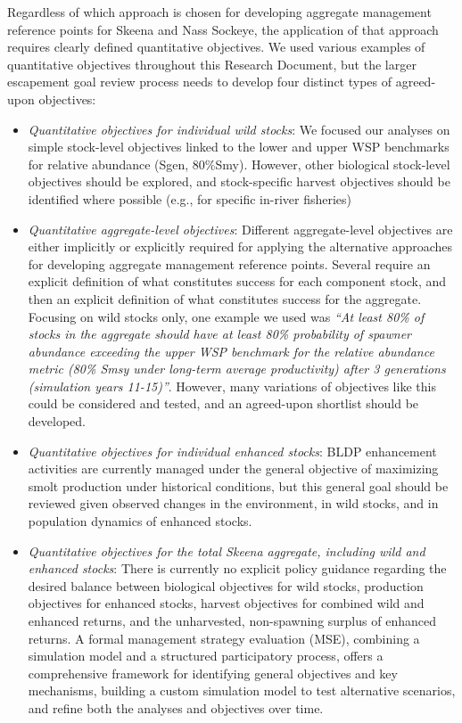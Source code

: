\documentclass[french,11pt]{book}
\begin{document}
Regardless of which approach is chosen for developing aggregate management reference points for Skeena and Nass Sockeye, the application of that approach requires clearly defined quantitative objectives. We used various examples of quantitative objectives throughout this Research Document, but the larger escapement goal review process needs to develop four distinct types of agreed-upon objectives:
\begin{itemize}

\item
  \emph{Quantitative objectives for individual wild stocks}: We focused our analyses on simple stock-level objectives linked to the lower and upper WSP benchmarks for relative abundance (Sgen, 80\%Smy). However, other biological stock-level objectives should be explored, and stock-specific harvest objectives should be identified where possible (e.g., for specific in-river fisheries)
\item
  \emph{Quantitative aggregate-level objectives}: Different aggregate-level objectives are either implicitly or explicitly required for applying the alternative approaches for developing aggregate management reference points. Several require an explicit definition of what constitutes success for each component stock, and then an explicit definition of what constitutes success for the aggregate. Focusing on wild stocks only, one example we used was \emph{``At least 80\% of stocks in the aggregate should have at least 80\% probability of spawner abundance exceeding the upper WSP benchmark for the relative abundance metric (80\% Smsy under long-term average productivity) after 3 generations (simulation years 11-15)''}. However, many variations of objectives like this could be considered and tested, and an agreed-upon shortlist should be developed.
\item
  \emph{Quantitative objectives for individual enhanced stocks}: BLDP enhancement activities are currently managed under the general objective of maximizing smolt production under historical conditions, but this general goal should be reviewed given observed changes in the environment, in wild stocks, and in population dynamics of enhanced stocks.
\item
  \emph{Quantitative objectives for the total Skeena aggregate, including wild and enhanced stocks}: There is currently no explicit policy guidance regarding the desired balance between biological objectives for wild stocks, production objectives for enhanced stocks, harvest objectives for combined wild and enhanced returns, and the unharvested, non-spawning surplus of enhanced returns. A formal management strategy evaluation (MSE), combining a simulation model and a structured participatory process, offers a comprehensive framework for identifying general objectives and key mechanisms, building a custom simulation model to test alternative scenarios, and refine both the analyses and objectives over time.
\end{itemize}
\end{document}
